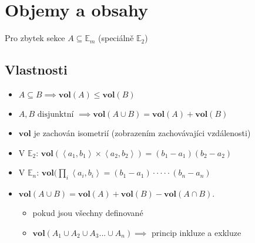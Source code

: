 \documentclass[../main.tex]{subfiles}
\begin{document}
\section{Objemy a obsahy}
Pro zbytek sekce $A \subseteq \mathbb{E}_m$ (speciálně $\mathbb{E}_2$)

\subsection{Vlastnosti}
\begin{itemize}
    \item $A \subseteq B \implies \mathbf{vol}(A) \leq \mathbf{vol}(B)$
    \item $A, B \text{ disjunktní } \implies \mathbf{vol}(A \cup B) = \mathbf{vol}(A) + \mathbf{vol}(B)$
		\item $\mathbf{vol}$ je zachován isometrií (zobrazením zachovávajíci vzdálenosti)
    \item V $\mathbb{E}_2$: $\mathbf{vol}(\left<a_1,b_1\right>\times \left<a_2,b_2\right>) = (b_1 - a_1)(b_2 - a_2)$
    \item V $\mathbb{E}_n$: $\mathbf{vol}(\prod_i \left<a_i,b_i\right> = (b_1 - a_1) \cdot \cdot \cdot \cdot \cdot (b_n-a_n)$
		\item $\mathbf{vol}(A \cup B) = \mathbf{vol}(A)+\mathbf{vol}(B)-\mathbf{vol}(A \cap B).$
		\begin{itemize}
			\item pokud jsou všechny definované
			\item $\textbf{vol}(A_1\cup A_2\cup A_3...\cup A_n) \implies$ princip inkluze a exkluze
		\end{itemize}
\end{itemize}
\end{document}
